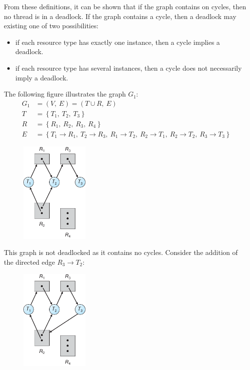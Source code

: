 \documentclass{article}
\begin{document}
From these definitions, it can be shown that if the graph contains on
cycles, then no thread is in a deadlock. If the graph contains a cycle,
then a deadlock may existing one of two possibilities:
\begin{itemize}
    \item if each resource type has exactly one instance, then a cycle
          implies a deadlock.
    \item if each resource type has several instances, then a cycle
          does not necessarily imply a deadlock.
\end{itemize}
The following figure illustrates the graph \(G_1\):
\begin{align*}
    G_1 & = \left( V,\: E \right) = \left( T \cup R,\: E \right) \\
    T   & = \left\{ T_1,\: T_2,\: T_3 \right\}                   \\
    R   & = \left\{ R_1,\: R_2,\: R_3,\: R_4 \right\}            \\
    E   & = \left\{
    T_1 \rightarrow R_1,\: T_2 \rightarrow R_3,\:
    R_1 \rightarrow T_2,\:
    R_2 \rightarrow T_1,\: R_2 \rightarrow T_2,\:
    R_3 \rightarrow T_3
    \right\}
\end{align*}
\begin{figure}[H]
    \centering
    \includegraphics[height = 5cm]{figures/resource_allocation_graph_1.pdf}
\end{figure}
This graph is not deadlocked as it contains no cycles. Consider the
addition of the directed edge \(R_3 \rightarrow T_2\):
\begin{figure}[H]
    \centering
    \includegraphics[height = 5cm]{figures/resource_allocation_graph_2.pdf}
\end{figure}
\end{document}
